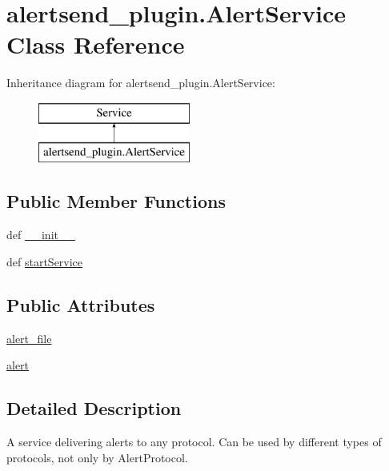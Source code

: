 \hypertarget{classalertsend__plugin_1_1_alert_service}{\section{alertsend\-\_\-plugin.\-Alert\-Service Class Reference}
\label{classalertsend__plugin_1_1_alert_service}
}
Inheritance diagram for alertsend\-\_\-plugin.\-Alert\-Service\-:\begin{figure}[H]
\begin{center}
\leavevmode
\includegraphics[height=2.000000cm]{classalertsend__plugin_1_1_alert_service}
\end{center}
\end{figure}
\subsection*{Public Member Functions}
\begin{DoxyCompactItemize}
\item 
def \hyperlink{classalertsend__plugin_1_1_alert_service_aad30f49127f44fed9d6bc0ae6ecb9ada}{\-\_\-\-\_\-init\-\_\-\-\_\-}
\item 
def \hyperlink{classalertsend__plugin_1_1_alert_service_ac431be3a763d8f455dd16fcd6f6fe872}{start\-Service}
\end{DoxyCompactItemize}
\subsection*{Public Attributes}
\begin{DoxyCompactItemize}
\item 
\hyperlink{classalertsend__plugin_1_1_alert_service_acc72890f5638b996635878a4b21f7f2b}{alert\-\_\-file}
\item 
\hyperlink{classalertsend__plugin_1_1_alert_service_a91b88386bc56aabc6e5e0477eb4f5946}{alert}
\end{DoxyCompactItemize}


\subsection{Detailed Description}
\begin{DoxyVerb}A service delivering alerts to any protocol.
Can be used by different types of protocols,
not only by AlertProtocol. 
\end{DoxyVerb}
 

